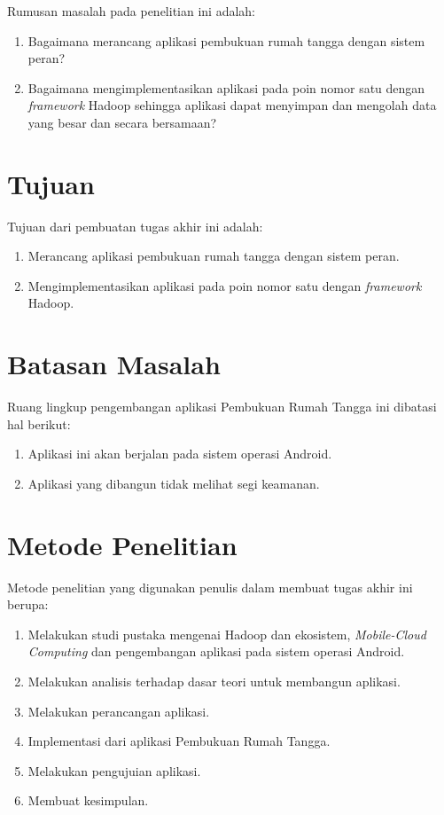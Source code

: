 Rumusan masalah pada penelitian ini adalah:
\begin{enumerate}
\item Bagaimana merancang aplikasi pembukuan rumah tangga dengan sistem peran?
\item Bagaimana mengimplementasikan aplikasi pada poin nomor satu dengan \textit{framework} Hadoop sehingga aplikasi dapat menyimpan dan mengolah data yang besar dan secara bersamaan?
\end{enumerate}

\section{Tujuan}
\label{sec:tujuan}

Tujuan dari pembuatan tugas akhir ini adalah:
\begin{enumerate}
\item Merancang aplikasi pembukuan rumah tangga dengan sistem peran.
\item Mengimplementasikan aplikasi pada poin nomor satu dengan \textit{framework} Hadoop.
\end{enumerate}

\section{Batasan Masalah}
\label{sec:batasanmasalah}

Ruang lingkup pengembangan aplikasi Pembukuan Rumah Tangga ini dibatasi hal berikut:
\begin{enumerate}
	\item Aplikasi ini akan berjalan pada sistem operasi Android.
	\item Aplikasi yang dibangun tidak melihat segi keamanan.
\end{enumerate}

\section{Metode Penelitian}
\label{sec:metodologipenelitian}

Metode penelitian yang digunakan penulis dalam membuat tugas akhir ini berupa:

\begin{enumerate}
	\item Melakukan studi pustaka mengenai Hadoop dan ekosistem, \textit{Mobile-Cloud Computing} dan pengembangan aplikasi pada sistem operasi Android.
	\item Melakukan analisis terhadap dasar teori untuk membangun aplikasi.
	\item Melakukan perancangan aplikasi.
	\item Implementasi dari aplikasi Pembukuan Rumah Tangga.
	\item Melakukan pengujuian aplikasi.
	\item Membuat kesimpulan.
\end{enumerate}

